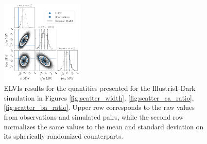 \documentclass[a4paper,fleqn,usenatbib]{mnras}
\begin{document}
\begin{figure}
\includegraphics[width=0.37\textwidth]{gaussian_model_elvis_MW_n_11.pdf}
\caption{ELVIs results for the quantities presented for the Illustris1-Dark
  simulation in Figures  \ref{fig:scatter_width},
  \ref{fig:scatter_ca_ratio}, \ref{fig:scatter_ba_ratio}.
Upper row corresponds to the raw values from observations and
simulated pairs, while the second row normalizes the same values to
the mean and standard deviation on its spherically randomized
counterparts. 
\label{fig:all_plots_elvis}}
\end{figure}
\end{document}

